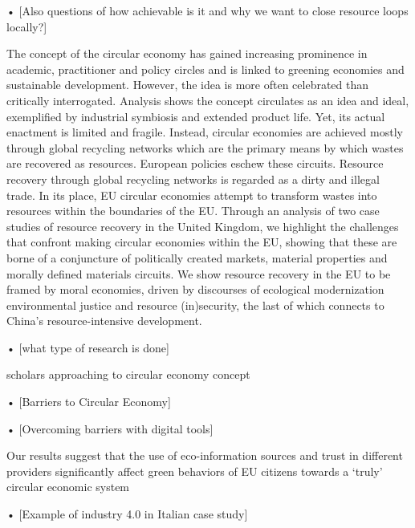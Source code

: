 •	[Also questions of how achievable is it and why we want to close resource loops locally?]

\parencite{Gregson2015}
The concept of the circular economy has gained increasing prominence in academic, practitioner and policy circles and is linked to greening economies and sustainable development. However, the idea is more often celebrated than critically interrogated. Analysis shows the concept circulates as an idea and ideal, exemplified by industrial symbiosis and extended product life. Yet, its actual enactment is limited and fragile. Instead, circular economies are achieved mostly through global recycling networks which are the primary means by which wastes are recovered as resources. European policies eschew these circuits. Resource recovery through global recycling networks is regarded as a dirty and illegal trade. In its place, EU circular economies attempt to transform wastes into resources within the boundaries of the EU. Through an analysis of two case studies of resource recovery in the United Kingdom, we highlight the challenges that confront making circular economies within the EU, showing that these are borne of a conjuncture of politically created markets, material properties and morally defined materials circuits. We show resource recovery in the EU to be framed by moral economies, driven by discourses of ecological modernization environmental justice and resource (in)security, the last of which connects to China’s resource-intensive development.

•	[what type of research is done] \par
\parencite{Merli2018} scholars approaching to circular economy concept



•	[Barriers to Circular Economy] \par 


•	[Overcoming barriers with digital tools] \par \parencite{Okorie}\par

\parencite{Amato2019}
Our results suggest that the use of eco-information sources and trust in different providers significantly affect green behaviors of EU citizens towards a ‘truly’ circular economic system








•	[Example of industry 4.0 in Italian case study] \par \parencite{Economy}



